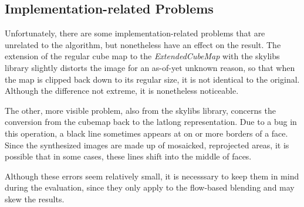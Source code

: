 \subsection{Implementation-related Problems}\label{subsec:bugs}
Unfortunately, there are some implementation-related problems that are unrelated to the algorithm, but nonetheless have an effect on the result. The extension of the regular cube map to the \emph{ExtendedCubeMap} with the skylibs library slightly distorts the image for an as-of-yet unknown reason, so that when the map is clipped back down to its regular size, it is not identical to the original. Although the difference not extreme, it is nonetheless noticeable.

The other, more visible problem, also from the skylibs library, concerns the conversion from the cubemap back to the latlong representation. Due to a bug in this operation, a black line sometimes appears at on or more borders of a face. Since the synthesized images are made up of mosaicked, reprojected areas, it is possible that in some cases, these lines shift into the middle of faces.

Although these errors seem relatively small, it is necesssary to keep them in mind during the evaluation, since they only apply to the flow-based blending and may skew the results.
